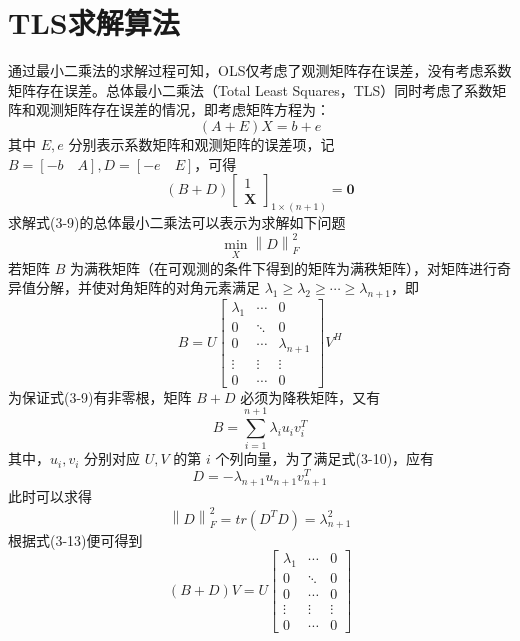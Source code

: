 \section{TLS求解算法}
通过最小二乘法的求解过程可知，OLS仅考虑了观测矩阵存在误差，没有考虑系数矩阵存在误差。总体最小二乘法（Total Least Squares，TLS）同时考虑了系数矩阵和观测矩阵存在误差的情况，即考虑矩阵方程为：
\begin{equation}
	(A+E)X = b + e
\end{equation}
其中 $E,e$ 分别表示系数矩阵和观测矩阵的误差项，记 $B = [-b \quad A],D = [-e \quad E]$，可得
\begin{equation}
	(B+D) \left[\begin{array}{c}
		1 \\ \bm{X}
	\end{array} \right]_{1\times (n+1)}= \bm{0}
\end{equation}
求解式(3-9)的总体最小二乘法可以表示为求解如下问题 
\begin{equation}
	\min_{X} \left\|D\right\|_F^2 
\end{equation}
若矩阵 $B$ 为满秩矩阵（在可观测的条件下得到的矩阵为满秩矩阵），对矩阵进行奇异值分解，并使对角矩阵的对角元素满足 $\lambda_1 \geq \lambda_2 \geq \cdots \geq \lambda_{n+1}$，即
\begin{equation}
	B = U \left[\begin{array}{ccc}
		\lambda_1 & \cdots & 0 \\
		0& \ddots & 0 \\
		0 & \cdots & \lambda_{n+1} \\
		\vdots & \vdots & \vdots \\
		0 & \cdots & 0
	\end{array}\right] V^H
\end{equation}
为保证式(3-9)有非零根，矩阵 $B+D$ 必须为降秩矩阵，又有
\begin{equation}
	B = \sum_{i=1}^{n+1}\lambda_i u_i v_i^T
\end{equation}
其中，$u_i,v_i$ 分别对应 $U,V$ 的第 $i$ 个列向量，为了满足式(3-10)，应有
\begin{equation}
	D = -\lambda_{n+1} u_{n+1} v_{n+1}^T
\end{equation}
此时可以求得
\begin{equation}
	\left\| D \right\|_F^2 = tr(D^TD) = \lambda_{n+1}^2
\end{equation}
根据式(3-13)便可得到
\begin{equation}
	(B+D)V = U\left[\begin{array}{ccc}
		\lambda_1 & \cdots & 0 \\
		0& \ddots & 0 \\
		0 & \cdots & 0 \\
		\vdots & \vdots & \vdots \\
		0 & \cdots & 0
	\end{array}\right]
\end{equation}
